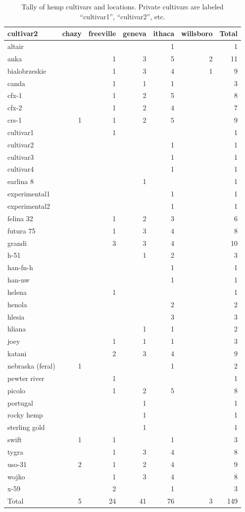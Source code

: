 \documentclass[
]{agujournal2019}
\begin{document}
\begin{longtable}[]{@{}lrrrrrr@{}}

\caption{\label{tbl-hemp_provenance}Tally of hemp cultivars and
locations. Private cultivars are labeled ``cultivar1'', ``cultivar2'',
etc.}

\tabularnewline

\toprule\noalign{}
cultivar2 & chazy & freeville & geneva & ithaca & willsboro & Total \\
\midrule\noalign{}
\endhead
\bottomrule\noalign{}
\endlastfoot
altair & & & & 1 & & 1 \\
anka & & 1 & 3 & 5 & 2 & 11 \\
bialobrzeskie & & 1 & 3 & 4 & 1 & 9 \\
canda & & 1 & 1 & 1 & & 3 \\
cfx-1 & & 1 & 2 & 5 & & 8 \\
cfx-2 & & 1 & 2 & 4 & & 7 \\
crs-1 & 1 & 1 & 2 & 5 & & 9 \\
cultivar1 & & 1 & & & & 1 \\
cultivar2 & & & & 1 & & 1 \\
cultivar3 & & & & 1 & & 1 \\
cultivar4 & & & & 1 & & 1 \\
earlina 8 & & & 1 & & & 1 \\
experimental1 & & & & 1 & & 1 \\
experimental2 & & & & 1 & & 1 \\
felina 32 & & 1 & 2 & 3 & & 6 \\
futura 75 & & 1 & 3 & 4 & & 8 \\
grandi & & 3 & 3 & 4 & & 10 \\
h-51 & & & 1 & 2 & & 3 \\
han-fn-h & & & & 1 & & 1 \\
han-nw & & & & 1 & & 1 \\
helena & & 1 & & & & 1 \\
henola & & & & 2 & & 2 \\
hlesia & & & & 3 & & 3 \\
hliana & & & 1 & 1 & & 2 \\
joey & & 1 & 1 & 1 & & 3 \\
katani & & 2 & 3 & 4 & & 9 \\
nebraska (feral) & 1 & & & 1 & & 2 \\
pewter river & & 1 & & & & 1 \\
picolo & & 1 & 2 & 5 & & 8 \\
portugal & & & 1 & & & 1 \\
rocky hemp & & & 1 & & & 1 \\
sterling gold & & & 1 & & & 1 \\
swift & 1 & 1 & & 1 & & 3 \\
tygra & & 1 & 3 & 4 & & 8 \\
uso-31 & 2 & 1 & 2 & 4 & & 9 \\
wojko & & 1 & 3 & 4 & & 8 \\
x-59 & & 2 & & 1 & & 3 \\
Total & 5 & 24 & 41 & 76 & 3 & 149 \\

\end{longtable}
\end{document}
